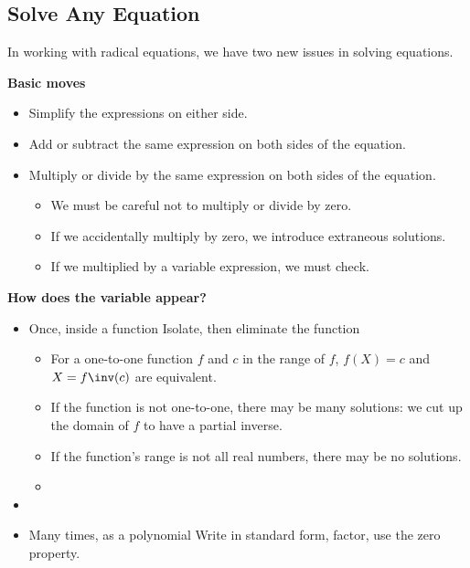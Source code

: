 \subsection{Solve Any Equation} 
In working with radical equations, we have two new issues in solving equations. 
\begin{fact}
\textbf{Basic moves}
\begin{itemize}
\item Simplify the expressions on either side.
\item Add or subtract the same expression on both sides of the equation.
\item Multiply or divide by the same expression on both sides of the equation.
\begin{itemize}
\item We must be careful not to multiply or divide by zero.
\item If we accidentally multiply by zero, we introduce extraneous solutions.
\item If we multiplied by a variable expression, we must check.
\end{itemize}
\end{itemize}
\textbf{How does the variable appear?}
\begin{itemize}
\item Once, inside a function {\textrightarrow} Isolate, then eliminate the function
\begin{itemize}
\item For a one-to-one function $f$ and $c$ in the range of $f$, $f(X)=c$ and $X=f\inv(c)$ are equivalent.
\item If the function is not one-to-one, there may be many solutions: we cut up the domain of $f$ to have a partial inverse.
\item If the function's range is not all real numbers, there may be no solutions.
\item {}
\end{itemize}
\item {}
\item Many times, as a polynomial {\textrightarrow} Write in standard form, factor, use the zero property.
\end{itemize}
\end{fact}